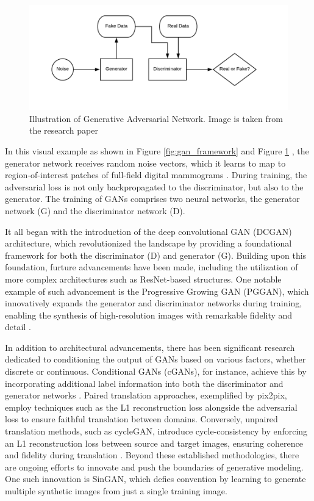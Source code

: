 \documentclass[UKenglish,12pt]{master-style}
\begin{document}
\begin{figure}[ht]
    \centering
    \includegraphics[width=1\textwidth]{Images/GAN.png}
    \caption{Illustration of Generative Adversarial Network. Image is taken from the research paper \cite{medigan}}
    \label{fig:GAN}
\end{figure}

In this visual example as shown in Figure \ref{fig:gan_framework} and Figure \ref{fig:GAN} \cite{medigan}, the generator network receives random noise vectors, which it learns to map to region-of-interest patches of full-field digital mammograms \cite{GAN} . During training, the adversarial loss is not only backpropagated to the discriminator, but also to the generator. The training of GANs comprises two neural networks, the generator network (G) and the discriminator network (D).

It all began with the introduction of the deep convolutional GAN (DCGAN) architecture, which revolutionized the landscape by providing a foundational framework for both the discriminator (D) and generator (G). Building upon this foundation, furture advancements have been made, including the utilization of more complex architectures such as ResNet-based structures. One notable example of such advancement is the Progressive Growing GAN (PGGAN), which innovatively expands the generator and discriminator networks during training, enabling the synthesis of high-resolution images with remarkable fidelity and detail \cite{medigan}.

In addition to architectural advancements, there has been significant research dedicated to conditioning the output of GANs based on various factors, whether discrete or continuous. Conditional GANs (cGANs), for instance, achieve this by incorporating additional label information into both the discriminator and generator networks\cite{GAN} .
Paired translation approaches, exemplified by pix2pix, employ techniques such as the L1 reconstruction loss alongside the adversarial loss to ensure faithful translation between domains. Conversely, unpaired translation methods, such as cycleGAN, introduce cycle-consistency by enforcing an L1 reconstruction loss between source and target images, ensuring coherence and fidelity during translation \cite{parmar2024onestep}. Beyond these established methodologies, there are ongoing efforts to innovate and push the boundaries of generative modeling. One such innovation is SinGAN, which defies convention by learning to generate multiple synthetic images from just a single training image\cite{syngan}.
\end{document}

